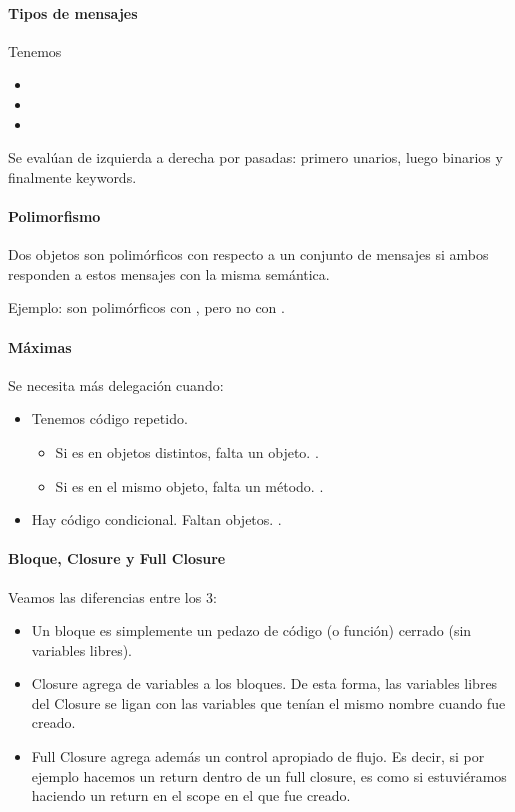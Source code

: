 \paragraph{Tipos de mensajes}

Tenemos
\begin{itemize}
  \item {}
  \item {}
  \item {}
\end{itemize}

Se evalúan de izquierda a derecha por pasadas: primero unarios, luego binarios y finalmente keywords.

\paragraph{Polimorfismo}

Dos objetos son polimórficos con respecto a un conjunto de mensajes si ambos responden a estos mensajes con la misma semántica.

Ejemplo:  son polimórficos con , pero no con .

\paragraph{Máximas}

Se necesita más delegación cuando:
\begin{itemize}
  \item Tenemos código repetido.
    \begin{itemize}
      \item Si es en objetos distintos, falta un objeto. .
      \item Si es en el mismo objeto, falta un método. .
    \end{itemize}
  \item Hay código condicional. Faltan objetos. .
\end{itemize}

\paragraph{Bloque, Closure y Full Closure}

Veamos las diferencias entre los 3:

\begin{itemize}
  \item Un bloque es simplemente un pedazo de código (o función) cerrado (sin variables libres).
  \item Closure agrega  de variables a los bloques. De esta forma, las variables libres del Closure se ligan con las variables que tenían el mismo nombre cuando fue creado.
  \item Full Closure agrega además un control apropiado de flujo. Es decir, si por ejemplo hacemos un return dentro de un full closure, es como si estuviéramos haciendo un return en el scope en el que fue creado.
\end{itemize}

